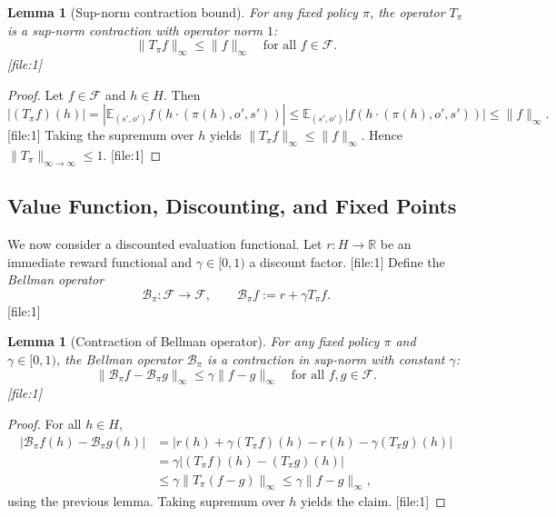 \documentclass[11pt,a4paper]{article}
\theoremstyle{tealstyle}
\newtheorem{lemma}[theorem]{Lemma}
\theoremstyle{definition}
\begin{document}
\begin{lemma}[Sup-norm contraction bound]
For any fixed policy \(\pi\), the operator \(T_\pi\) is a sup-norm contraction with operator norm \(1\):
\[
  \|T_\pi f\|_\infty \le \|f\|_\infty \quad \text{for all } f \in \mathcal{F}.
\] [file:1]
\end{lemma}

\begin{proof}
Let \(f \in \mathcal{F}\) and \(h \in H\). Then
\[
  |(T_\pi f)(h)|
  = \left|\mathbb{E}_{(s',o')} f(h \cdot (\pi(h),o',s'))\right|
  \le \mathbb{E}_{(s',o')} |f(h \cdot (\pi(h),o',s'))|
  \le \|f\|_\infty.
\] [file:1]
Taking the supremum over \(h\) yields \(\|T_\pi f\|_\infty \le \|f\|_\infty\). Hence \(\|T_\pi\|_{\infty \to \infty} \le 1\). [file:1]
\end{proof}

\subsection{Value Function, Discounting, and Fixed Points}

We now consider a discounted evaluation functional. Let \(r : H \to \mathbb{R}\) be an immediate reward functional and \(\gamma \in [0,1)\) a discount factor. [file:1] Define the \emph{Bellman operator}
\[
  \mathcal{B}_\pi : \mathcal{F} \to \mathcal{F}, \qquad
  \mathcal{B}_\pi f := r + \gamma T_\pi f.
\] [file:1]

\begin{lemma}[Contraction of Bellman operator]
For any fixed policy \(\pi\) and \(\gamma \in [0,1)\), the Bellman operator \(\mathcal{B}_\pi\) is a contraction in sup-norm with constant \(\gamma\):
\[
  \|\mathcal{B}_\pi f - \mathcal{B}_\pi g\|_\infty \le \gamma \|f - g\|_\infty
  \quad \text{for all } f,g \in \mathcal{F}.
\] [file:1]
\end{lemma}

\begin{proof}
For all \(h \in H\),
\begin{align*}
  \bigl|\mathcal{B}_\pi f(h) - \mathcal{B}_\pi g(h)\bigr|
  &= \bigl|r(h) + \gamma (T_\pi f)(h) - r(h) - \gamma (T_\pi g)(h)\bigr| \\
  &= \gamma \bigl|(T_\pi f)(h) - (T_\pi g)(h)\bigr| \\
  &\le \gamma \|T_\pi(f-g)\|_\infty
  \le \gamma \|f-g\|_\infty,
\end{align*}
using the previous lemma. Taking supremum over \(h\) yields the claim. [file:1]
\end{proof}
\end{document}
